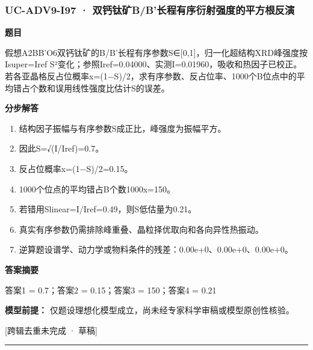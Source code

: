 \documentclass[UTF8,11pt,a4paper]{ctexart}
\begin{document}
\subsubsection*{UC-ADV9-I97 · 双钙钛矿B/B'长程有序衍射强度的平方根反演}
\noindent\textbf{题目}\par
假想A2BB'O6双钙钛矿的B/B'长程有序参数S∈[0,1]，归一化超结构XRD峰强度按Isuper=Iref S²变化；参照Iref=0.04000、实测I=0.01960，吸收和热因子已校正。若各亚晶格反占位概率x=(1−S)/2，求有序参数、反占位率、1000个B位点中的平均错占个数和误用线性强度比估计S的误差。\par
\medskip\noindent\textbf{分步解答}
\begin{enumerate}
\item 结构因子振幅与有序参数S成正比，峰强度为振幅平方。
\item 因此S=√(I/Iref)=0.7。
\item 反占位概率x=(1−S)/2=0.15。
\item 1000个位点的平均错占B个数1000x=150。
\item 若错用Slinear=I/Iref=0.49，则S低估量为0.21。
\item 真实有序参数仍需排除峰重叠、晶粒择优取向和各向异性热振动。
\item 逆算题设谱学、动力学或物料条件的残差：0.00e+0、0.00e+0、0.00e+0。
\end{enumerate}
\noindent\textbf{答案摘要}\par
答案1 = 0.7；答案2 = 0.15；答案3 = 150；答案4 = 0.21\par
\noindent\textbf{模型前提：}
仅题设理想化模型成立，尚未经专家科学审稿或模型原创性核验。\par
\noindent\textcolor{red!65!black}{[跨辑去重未完成 · 草稿]} \par
\medskip\hrule\medskip
{}
\end{document}
